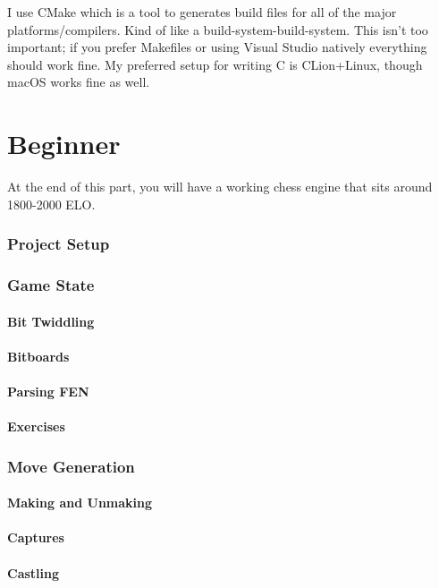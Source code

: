 \documentclass{article}
\begin{document}
I use CMake which is a tool to generates build files for all of the major platforms/compilers. Kind of like a build-system-build-system. This isn't too important; if you prefer Makefiles or using Visual Studio natively everything should work fine. My preferred setup for writing C is CLion+Linux, though macOS works fine as well. 

\newpage
\part{Beginner}
At the end of this part, you will have a working chess engine that sits around 1800-2000 ELO. 

\section{Project Setup}

\section{Game State}
\subsection{Bit Twiddling}
\subsection{Bitboards}
\subsection{Parsing FEN}
\subsection{Exercises}

\section{Move Generation}
\subsection{Making and Unmaking}
\subsection{Captures}
\subsection{Castling}
\end{document}
